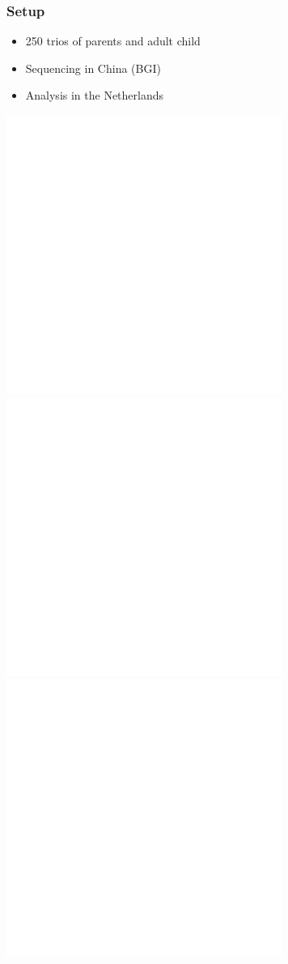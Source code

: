 \documentclass[slidestop,14pt]{beamer}
\begin{document}
\begin{frame}
  \frametitle{Setup}

  \vspace{\baselineskip}

  \begin{itemize}
    \item 250 trios of parents and adult child
    \item Sequencing in China (BGI)
    \item Analysis in the Netherlands
  \end{itemize}

  \vspace{\baselineskip}

  \includegraphics[width=0.3\linewidth,transparent]{parents-girl.png}
  \includegraphics[width=0.3\linewidth,transparent]{parents-boy.png}
  \includegraphics[width=0.3\linewidth,transparent]{parents-girl.png}
\end{frame}
\end{document}
